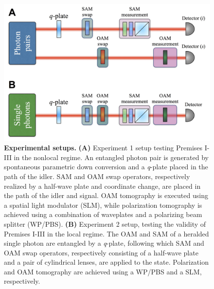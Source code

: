 \documentclass[12pt]{iopart}
\begin{document}
\begin{figure}[t]
	\centering
	\includegraphics[width=0.9\columnwidth]{fig2.jpg}
	\caption{{\bf Experimental setups.} {\bf (A)} Experiment 1 setup testing Premises I-III in the nonlocal regime. An entangled photon pair is generated by spontaneous parametric down conversion and a \textit{q}-plate placed in the path of the idler. SAM and OAM swap operators, respectively realized by a half-wave plate and coordinate change, are placed in the path of the idler and signal. OAM tomography is executed using a spatial light modulator (SLM), while polarization tomography is achieved using a combination of waveplates and a polarizing beam splitter (WP/PBS). {\bf (B)} Experiment 2 setup, testing the validity of Premises I-III in the local regime. The OAM and SAM of a heralded single photon are entangled by a \textit{q}-plate, following which SAM and OAM swap operators, respectively consisting of a half-wave plate and a pair of cylindrical lenses, are applied to the state. Polarization and OAM tomography are achieved using a WP/PBS and a SLM, respectively.}%
\label{fig:fig2}
\end{figure}
%
 
\end{document}
